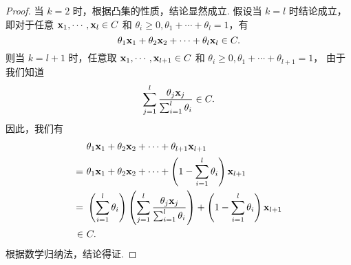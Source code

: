\documentclass[UTF8]{ctexart}
\begin{document}
\begin{proof}
  当 $k=2$ 时，根据凸集的性质，结论显然成立.
  假设当 $k=l$ 时结论成立，即对于任意 $\mathbf x_1,\cdots,\mathbf x_l\in C$ 和 $\theta_i\geq 0, \theta_1+\cdots+\theta_l=1$，有
  \begin{equation}
    \theta_1\mathbf x_1+\theta_2\mathbf x_2+\cdots+\theta_l\mathbf x_l\in C.
  \end{equation}
  则当 $k=l+1$ 时，任意取 $\mathbf x_1,\cdots,\mathbf x_{l+1}\in C$ 和 $\theta_i\geq 0, \theta_1+\cdots+\theta_{l+1}=1$，
  由于我们知道
  \begin{equation}
    \sum_{j=1}^{l}\frac{\theta_j\mathbf x_j}{\sum_{i=1}^l\theta_i}\in C.
  \end{equation}
  因此，我们有
  \begin{align*}
     &~\theta_1\mathbf x_1+\theta_2\mathbf x_2+\cdots+\theta_{l+1}\mathbf x_{l+1}\\
    =&~\theta_1\mathbf x_1+\theta_2\mathbf x_2+\cdots+\left(1-\sum_{i=1}^l \theta_i\right)\mathbf x_{l+1}\\
    =&~\left(\sum_{i=1}^l\theta_i\right)\left(\sum_{j=1}^{l}\frac{\theta_j\mathbf x_j}{\sum_{i=1}^l\theta_i}\right)+\left(1-\sum_{i=1}^l \theta_i\right)\mathbf x_{l+1}\\
  \in&~C.
  \end{align*}
  根据数学归纳法，结论得证.
\end{proof}

\end{document}
